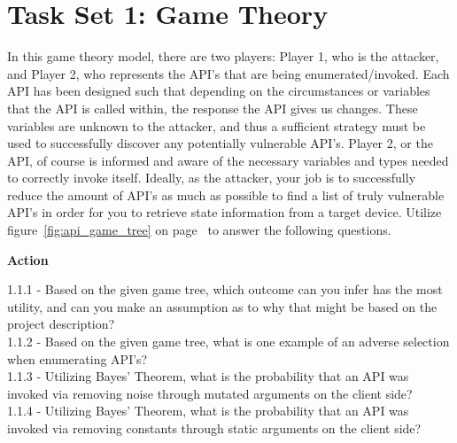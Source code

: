 \documentclass[letterpaper,12pt]{report}
\begin{document}
\bigskip


\break

\section*{Task Set 1: Game Theory}\label{sec:Task 1: Game Theory}

In this game theory model, there are two players: Player 1, who is the attacker, and Player 2, who represents the API's that are being enumerated/invoked. Each API has been designed such that depending on the circumstances or variables that the API is called within, the response the API gives us changes. These variables are unknown to the attacker, and thus a sufficient strategy must be used to successfully discover any potentially vulnerable API's. Player 2, or the API, of course is informed and aware of the necessary variables and types needed to correctly invoke itself. Ideally, as the attacker, your job is to successfully reduce the amount of API's as much as possible to find a list of truly vulnerable API's in order for you to retrieve state information from a target device. Utilize figure~\ref{fig:api_game_tree} on page~\pageref{fig:api_game_tree} to answer the following questions.

\bigskip

\bigskip

\bigskip

\begin{mdframed}[backgroundcolor=blue!10,style=code,nobreak=true,align=center,userdefinedwidth=14cm]

\textbf{Action}
\bigskip

1.1.1 -  Based on the given game tree, which outcome can you infer has the most utility, and can you make an assumption as to why that might be based on the project description?\\
1.1.2 - Based on the given game tree, what is one example of an adverse selection when enumerating API’s?\\
1.1.3 - Utilizing Bayes' Theorem, what is the probability that an API was invoked via removing noise through mutated arguments on the client side?\\
1.1.4 - Utilizing Bayes' Theorem, what is the probability that an API was invoked via removing constants through static arguments on the client side?\\
\end{mdframed}
\end{document}
